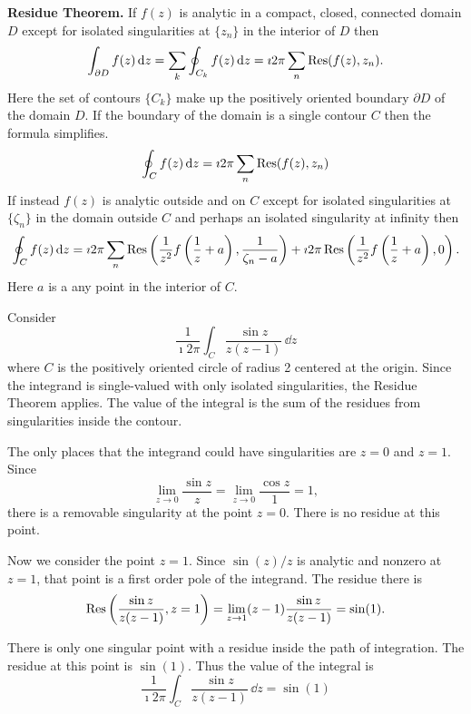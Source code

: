 \begin{Result}
  \textbf{Residue Theorem.}
  If $f(z)$ is analytic in a compact, closed, connected domain $D$
  except for isolated singularities at $\{ z_n \}$ in the interior of $D$ then
  \[ 
  \int_{\partial D} f(z)\,\mathrm{d} z 
  = \sum_k \oint_{C_k} f(z)\,\mathrm{d} z 
  = \imath 2 \pi \sum_n \mathop{\mathrm{Res}}\nolimits(f(z),z_n).
  \]
  Here the set of contours $\{ C_k \}$ make up the positively oriented boundary
  $\partial D$ of the domain $D$.  If the boundary of the domain is a single contour 
  $C$ then the formula simplifies.
  \[ 
  \oint_C f(z)\,\mathrm{d} z = \imath 2 \pi \sum_n \mathop{\mathrm{Res}}\nolimits(f(z),z_n)
  \]
  If instead $f(z)$ is analytic outside and on $C$ 
  except for isolated singularities at $\{ \zeta_n \}$ in the domain outside $C$ and
  perhaps an isolated singularity at infinity then
  \[ 
  \oint_C f(z)\,\mathrm{d} z 
  = \imath 2 \pi \sum_n \mathop{\mathrm{Res}}\nolimits \left( \frac{1}{z^2} f \left(\frac{1}{z} + a \right), 
    \frac{1}{\zeta_n - a} \right)
  + \imath 2 \pi \mathop{\mathrm{Res}}\nolimits \left( \frac{1}{z^2} f \left(\frac{1}{z} + a \right), 0 \right).
  \]
  Here $a$ is a any point in the interior of $C$.
\end{Result}








\begin{Example}
  Consider
  \[
  \frac{1}{\imath 2 \pi}\int_C \frac{\sin z}{z(z-1)} \,\dd z
  \]
  where $C$ is the positively oriented circle of radius 2 centered at the origin.
  Since the integrand is single-valued with only isolated singularities, 
  the Residue Theorem applies.  The value of the integral is the sum of 
  the residues from singularities inside the contour.

  The only places that the integrand could have singularities are $z = 0$ and
  $z = 1$.  Since
  \[
  \lim_{z \to 0} \frac{\sin z}{z} = \lim_{z \to 0} \frac{\cos z}{1} = 1,
  \]
  there is a removable singularity at the point $z = 0$.  There is no residue
  at this point.

  Now we consider the point $z = 1$.
  Since $\sin(z) / z$ is analytic and nonzero at $z = 1$, that point is a 
  first order pole of the integrand.  The residue there is
  \[
  \mathop{\mathrm{Res}}\nolimits \left( \frac{ \sin z }{ z (z-1) }, z = 1 \right)
  = \lim_{z \to 1} (z - 1) \frac{ \sin z }{ z (z-1) }
  = \sin(1).
  \]

  There is only one singular point with a residue inside the path of integration.
  The residue at this point is $\sin(1)$.  Thus the value of the integral is
  \[
  \frac{1}{\imath 2 \pi}\int_C \frac{\sin z}{z(z-1)} \,\dd z = \sin(1)
  \]
\end{Example}





















